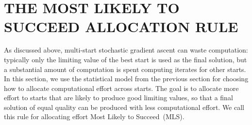 \documentclass[12pt,english]{article}
\newcommand{\abbrv}{MLS}
\newcommand{\name}{Most Likely to Succeed}
\begin{document}


\section{THE MOST LIKELY TO SUCCEED ALLOCATION RULE}
\label{MLS}


As discussed above, multi-start stochastic gradient ascent can waste computation: typically only the limiting value of the best start is used as the final solution, but a substantial amount of computation is spent computing iterates for other starts.  In this section, we use the statistical model from the previous section for choosing how to allocate computational effort across starts.  The goal is to allocate more effort to starts that are likely to produce good limiting values, so that a final solution of equal quality can be produced with less computational effort. We call this rule for allocating effort \name\ (\abbrv).
\end{document}
